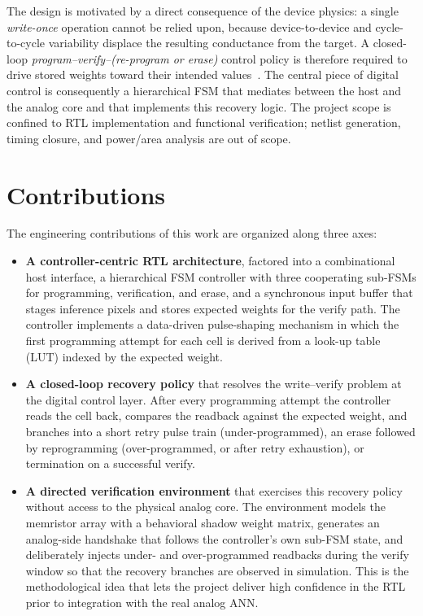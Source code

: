 The design is motivated by a direct consequence of the device physics: a
single \emph{write-once} operation cannot be relied upon, because
device-to-device and cycle-to-cycle variability displace the resulting
conductance from the target. A closed-loop
\emph{program--verify--(re-program or erase)} control policy is therefore
required to drive stored weights toward their intended
values~\cite{Ielmini2018RRAM, Sebastian2020IMC, Wang2022YFlash}. The
central piece of digital control is consequently a hierarchical FSM that
mediates between the host and the analog core and that implements this
recovery logic. The project scope is confined to RTL implementation and
functional verification; netlist generation, timing closure, and
power/area analysis are out of scope.

\section{Contributions}
\label{sec:intro-contributions}

The engineering contributions of this work are organized along three
axes:

\begin{itemize}
    \item \textbf{A controller-centric RTL architecture}, factored into a
          combinational host interface, a hierarchical FSM controller with
          three cooperating sub-FSMs for programming, verification, and
          erase, and a synchronous input buffer that stages inference
          pixels and stores expected weights for the verify path. The
          controller implements a data-driven pulse-shaping mechanism in
          which the first programming attempt for each cell is derived
          from a look-up table (LUT) indexed by the expected weight.
    \item \textbf{A closed-loop recovery policy} that resolves the
          write--verify problem at the digital control layer. After every
          programming attempt the controller reads the cell back,
          compares the readback against the expected weight, and branches
          into a short retry pulse train (under-programmed), an erase
          followed by reprogramming (over-programmed, or after retry
          exhaustion), or termination on a successful verify.
    \item \textbf{A directed verification environment} that exercises
          this recovery policy without access to the physical analog
          core. The environment models the memristor array with a
          behavioral shadow weight matrix, generates an analog-side
          handshake that follows the controller's own sub-FSM state, and
          deliberately injects under- and over-programmed readbacks
          during the verify window so that the recovery branches are
          observed in simulation. This is the methodological idea that
          lets the project deliver high confidence in the RTL prior to
          integration with the real analog ANN.
\end{itemize}

